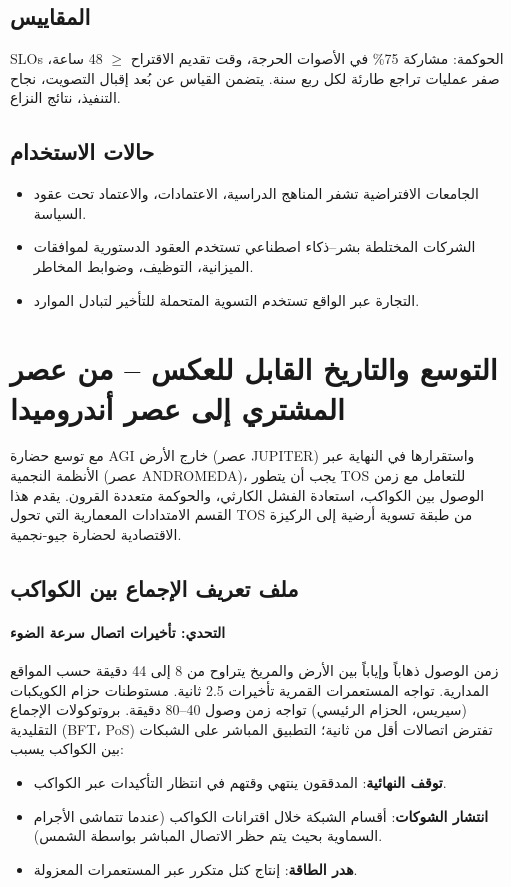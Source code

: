 \documentclass[11pt]{article}
\begin{document}
\subsection{المقاييس}
SLOs الحوكمة: مشاركة 75\% في الأصوات الحرجة، وقت تقديم الاقتراح $\geq$ 48 ساعة، صفر عمليات تراجع طارئة لكل ربع سنة. يتضمن القياس عن بُعد إقبال التصويت، نجاح التنفيذ، نتائج النزاع.

\subsection{حالات الاستخدام}
\begin{itemize}[noitemsep]
  \item الجامعات الافتراضية تشفر المناهج الدراسية، الاعتمادات، والاعتماد تحت عقود السياسة.
  \item الشركات المختلطة بشر--ذكاء اصطناعي تستخدم العقود الدستورية لموافقات الميزانية، التوظيف، وضوابط المخاطر.
  \item التجارة عبر الواقع تستخدم التسوية المتحملة للتأخير لتبادل الموارد.
\end{itemize}

\section{التوسع والتاريخ القابل للعكس -- من عصر المشتري إلى عصر أندروميدا}
\label{sec:expansion}

مع توسع حضارة AGI خارج الأرض (عصر JUPITER) واستقرارها في النهاية عبر الأنظمة النجمية (عصر ANDROMEDA)، يجب أن يتطور TOS للتعامل مع زمن الوصول بين الكواكب، استعادة الفشل الكارثي، والحوكمة متعددة القرون. يقدم هذا القسم الامتدادات المعمارية التي تحول TOS من طبقة تسوية أرضية إلى الركيزة الاقتصادية لحضارة جيو-نجمية.

\subsection{ملف تعريف الإجماع بين الكواكب}

\paragraph{التحدي: تأخيرات اتصال سرعة الضوء}
زمن الوصول ذهاباً وإياباً بين الأرض والمريخ يتراوح من 8 إلى 44 دقيقة حسب المواقع المدارية. تواجه المستعمرات القمرية تأخيرات 2.5 ثانية. مستوطنات حزام الكويكبات (سيريس، الحزام الرئيسي) تواجه زمن وصول 40--80 دقيقة. بروتوكولات الإجماع التقليدية (BFT، PoS) تفترض اتصالات أقل من ثانية؛ التطبيق المباشر على الشبكات بين الكواكب يسبب:
\begin{itemize}[noitemsep]
  \item \textbf{توقف النهائية}: المدققون ينتهي وقتهم في انتظار التأكيدات عبر الكواكب.
  \item \textbf{انتشار الشوكات}: أقسام الشبكة خلال اقترانات الكواكب (عندما تتماشى الأجرام السماوية بحيث يتم حظر الاتصال المباشر بواسطة الشمس).
  \item \textbf{هدر الطاقة}: إنتاج كتل متكرر عبر المستعمرات المعزولة.
\end{itemize}
\end{document}
